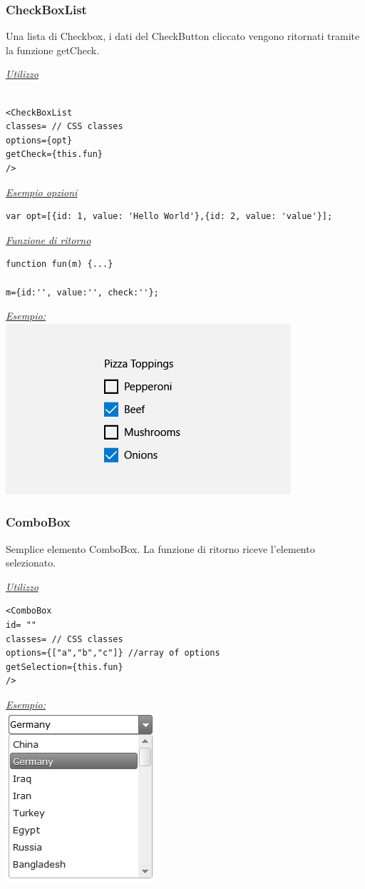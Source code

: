 \subsubsection{CheckBoxList}
Una lista di Checkbox, i dati del CheckButton cliccato vengono ritornati tramite la funzione getCheck.
\begin{center}
\underline{\textit{Utilizzo}}
\begin{lstlisting}

<CheckBoxList
classes= // CSS classes
options={opt}
getCheck={this.fun}
/>
\end{lstlisting}
\underline{\textit{Esempio opzioni}}
\begin{lstlisting}
var opt=[{id: 1, value: 'Hello World'},{id: 2, value: 'value'}];
\end{lstlisting}
\underline{\textit{Funzione di ritorno}}
\begin{lstlisting}
function fun(m) {...}

m={id:'', value:'', check:''};
\end{lstlisting}
\underline{\textit{Esempio:}}
\\
\includegraphics[scale=0.6]{img/checkbox.png}
\\
\end{center}


\subsubsection{ComboBox}
Semplice elemento ComboBox. La funzione di ritorno riceve l'elemento selezionato.
\begin{center}
\underline{\textit{Utilizzo}}
\begin{lstlisting}
<ComboBox
id= ""
classes= // CSS classes
options={["a","b","c"]} //array of options
getSelection={this.fun}
/>
\end{lstlisting}
\underline{\textit{Esempio:}}
\\
\includegraphics[scale=0.9]{img/combobox.png}
\newpage
\end{center}

